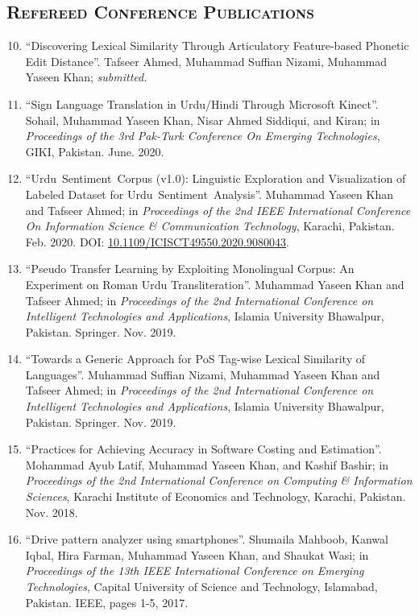 \documentclass[a4paper, 10pt]{article}
\begin{document}
\subsection*{\normalfont\textsc{Refereed Conference Publications}}
\begin{enumerate}
\setcounter{enumi}{9}
\itemsep-4pt 
\item ``Discovering Lexical Similarity Through Articulatory Feature-based Phonetic Edit Distance''. Tafseer Ahmed, Muhammad Suffian Nizami, Muhammad Yaseen Khan; \emph{\small submitted.}

\item ``Sign Language Translation in Urdu/Hindi Through Microsoft Kinect''. Sohail, Muhammad Yaseen Khan, Nisar Ahmed Siddiqui, and Kiran; in \emph{Proceedings of the 3rd Pak-Turk Conference On Emerging Technologies}, GIKI, Pakistan. June. 2020.

\item ``Urdu~Sentiment~Corpus (v1.0): Linguistic Exploration and Visualization of Labeled Dataset for Urdu~Sentiment~Analysis''. Muhammad Yaseen Khan and Tafseer Ahmed; in \emph{Proceedings of the 2nd IEEE International Conference On Information Science \& Communication Technology}, Karachi, Pakistan. Feb. 2020. DOI: \href{10.1109/ICISCT49550.2020.9080043}{10.1109/ICISCT49550.2020.9080043}.

 \item ``Pseudo Transfer Learning by Exploiting Monolingual Corpus: An Experiment on Roman Urdu Transliteration''. Muhammad Yaseen Khan and Tafseer Ahmed; in \emph{Proceedings of the 2nd International Conference on Intelligent Technologies and Applications}, Islamia University Bhawalpur, Pakistan. Springer. Nov. 2019.
 
  \item ``Towards a Generic Approach for PoS Tag-wise Lexical Similarity of Languages''. Muhammad Suffian Nizami, Muhammad Yaseen Khan and Tafseer Ahmed; in \emph{Proceedings of the 2nd International Conference on Intelligent Technologies and Applications}, Islamia University Bhawalpur, Pakistan. Springer. Nov. 2019.
  
  \item ``Practices for Achieving Accuracy in Software Costing and Estimation''. Mohammad Ayub Latif, Muhammad Yaseen Khan, and Kashif Bashir; in \emph{Proceedings of the 2nd International Conference on Computing \& Information Sciences}, Karachi Institute of Economics and Technology, Karachi, Pakistan. Nov. 2018.
  
  \item ``Drive pattern analyzer using smartphones''. Shumaila Mahboob, Kanwal Iqbal, Hira Farman, Muhammad Yaseen Khan, and Shaukat Wasi; in \emph{ Proceedings of the 13th IEEE International Conference on Emerging Technologies}, Capital University of Science and Technology, Islamabad, Pakistan. IEEE, pages 1-5, 2017.
  

\end{enumerate}
\end{document}
